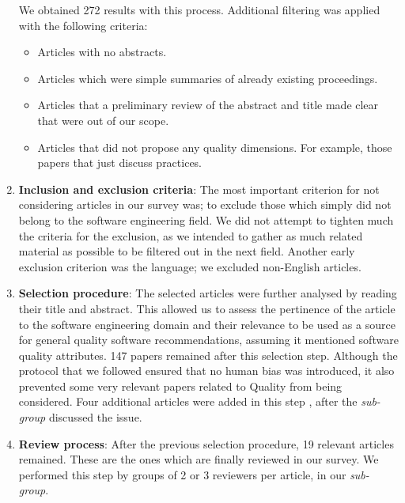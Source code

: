 \begin{enumerate}
    We obtained 272 results with this process. Additional filtering was applied with the following criteria:
    \begin{itemize}
        \item Articles with no abstracts.
        \item Articles which were simple summaries of already existing proceedings.
        \item Articles that a preliminary review of the abstract and title made clear that were out of our scope.
        \item Articles that did not propose any quality dimensions. For example, those papers that just discuss practices.
    \end{itemize}

    \item \textbf{Inclusion and exclusion criteria}: The most important criterion for not considering articles in our survey was; to exclude those which simply did not belong to the software engineering field. We did not attempt to tighten much the criteria for the exclusion, as we intended to gather as much related material as possible to be filtered out in the next field. Another early exclusion criterion was the language; we excluded non-English articles.

    \item \textbf{Selection procedure}: The selected articles were further analysed by reading their title and abstract. This allowed us to assess the pertinence of the article to the software engineering domain and their relevance to be used as a source for general quality software recommendations, assuming it mentioned software quality attributes. 147 papers remained after this selection step. Although the protocol that we followed ensured that no human bias was introduced, it also prevented some very relevant papers related to Quality from being considered. Four additional articles were added in this step \cite{orviz_set_2017,orviz_fernandez_eosc-synergy_2020,raymond_software_2013,shepherdson_cessda_2019}, after the \textit{sub-group} discussed the issue.

    \item \textbf{Review process}: After the previous selection procedure, 19 relevant articles remained. These are the ones which are finally reviewed in our survey. We performed this step by groups of 2 or 3 reviewers per article, in our \textit{sub-group}.
\end{enumerate}

